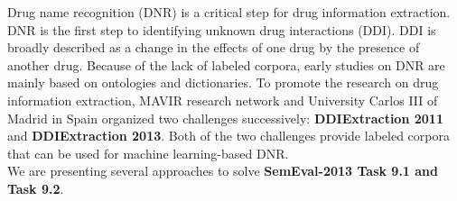 

Drug name recognition (DNR) is a critical step for drug information extraction.
DNR is the first step to identifying unknown drug interactions (DDI).
DDI is broadly described as a change in the effects of one drug by the presence of another drug.
Because of the lack of labeled corpora, early studies on DNR are mainly based on ontologies and dictionaries.
To promote the research on drug information extraction, MAVIR research network and University Carlos III of Madrid in Spain organized two challenges successively: \textbf{DDIExtraction 2011} and \textbf{DDIExtraction 2013}. 
Both of the two challenges provide labeled corpora that can be used for machine learning-based DNR.\\
We are presenting several approaches to solve \textbf{SemEval-2013 Task 9.1 and Task 9.2}. 
